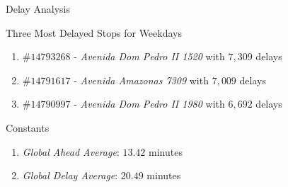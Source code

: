 \documentclass[xcolor=dvipsnames,table]{beamer}
\begin{document}
\begin{frame}{Delay Analysis}
        \begin{block}{Three Most Delayed Stops for Weekdays}
                \begin{enumerate}
                        \item $\#14793268$ - \textit{Avenida Dom Pedro II 1520} with $7,309$ delays 
                        \item $\#14791617$ - \textit{Avenida Amazonas 7309} with $7,009$ delays
                        \item $\#14790997$ - \textit{Avenida Dom Pedro II 1980} with $6,692$ delays 
                \end{enumerate}
        \end{block}
        \begin{block}{Constants} 
                \begin{enumerate}
                        \item \textit{Global Ahead Average}: $13.42$ minutes 
                        \item \textit{Global Delay Average}: $20.49$ minutes 
                \end{enumerate}
        \end{block}
\end{frame}
\end{document}
